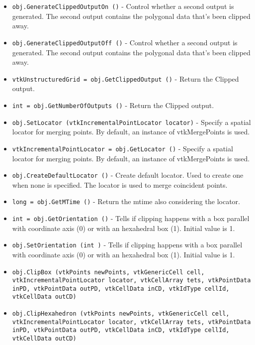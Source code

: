 \begin{itemize}
\item  \verb|obj.GenerateClippedOutputOn ()| -  Control whether a second output is generated. The second output
 contains the polygonal data that's been clipped away.

\item  \verb|obj.GenerateClippedOutputOff ()| -  Control whether a second output is generated. The second output
 contains the polygonal data that's been clipped away.

\item  \verb|vtkUnstructuredGrid = obj.GetClippedOutput ()| -  Return the Clipped output.

\item  \verb|int = obj.GetNumberOfOutputs ()| -  Return the Clipped output.

\item  \verb|obj.SetLocator (vtkIncrementalPointLocator locator)| -  Specify a spatial locator for merging points. By default, an
 instance of vtkMergePoints is used.

\item  \verb|vtkIncrementalPointLocator = obj.GetLocator ()| -  Specify a spatial locator for merging points. By default, an
 instance of vtkMergePoints is used.

\item  \verb|obj.CreateDefaultLocator ()| -  Create default locator. Used to create one when none is specified. The 
 locator is used to merge coincident points.

\item  \verb|long = obj.GetMTime ()| -  Return the mtime also considering the locator.

\item  \verb|int = obj.GetOrientation ()| -  Tells if clipping happens with a box parallel with coordinate axis
 (0) or with an hexahedral box (1). Initial value is 1.

\item  \verb|obj.SetOrientation (int )| -  Tells if clipping happens with a box parallel with coordinate axis
 (0) or with an hexahedral box (1). Initial value is 1.

\item  \verb|obj.ClipBox (vtkPoints newPoints, vtkGenericCell cell, vtkIncrementalPointLocator locator, vtkCellArray tets, vtkPointData inPD, vtkPointData outPD, vtkCellData inCD, vtkIdType cellId, vtkCellData outCD)|

\item  \verb|obj.ClipHexahedron (vtkPoints newPoints, vtkGenericCell cell, vtkIncrementalPointLocator locator, vtkCellArray tets, vtkPointData inPD, vtkPointData outPD, vtkCellData inCD, vtkIdType cellId, vtkCellData outCD)|


\end{itemize}
